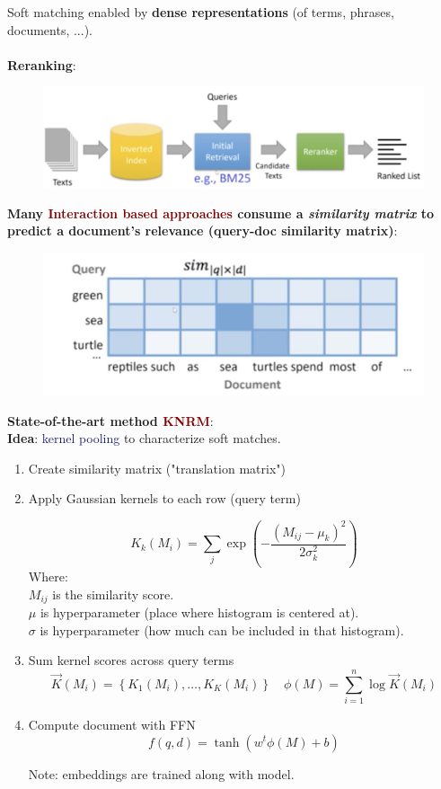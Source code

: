 Soft matching enabled by \textbf{dense representations} (of terms, phrases, documents, ...).\\
\\
\textbf{Reranking}: 
\begin{figure}[ht!]
    \includegraphics[scale=0.75]{figures/reranking.png}
\end{figure}

\vspace{0.35cm}

\textbf{Many \textcolor{Maroon}{Interaction based approaches} consume a \textit{similarity matrix} to predict a document's relevance (query-doc similarity matrix)}: 
\begin{figure}[ht!]
    \includegraphics[scale=0.75]{figures/sim_matrix.png}
\end{figure}

\newpage

\textbf{State-of-the-art method \textcolor{Maroon}{KNRM}}:\\
\textbf{Idea}: \textcolor{MidnightBlue}{kernel pooling} to characterize soft matches.

\begin{enumerate}
    \item Create similarity matrix ("translation matrix")
    \item Apply Gaussian kernels to each row (query term)
    
    $$ K_k (M_i) = \sum_j \exp(- \frac{(M_{ij} - \mu_k)^2}{2\sigma^2_k}) $$
    Where: \\
    $M_{ij}$ is the similarity score. \\
    $\mu$ is hyperparameter (place where histogram is centered at). \\
    $\sigma$ is hyperparameter (how much can be included in that histogram).
    \item Sum kernel scores across query terms
    $$ \vec{K}\left(M_{i}\right)=\left\{K_{1}\left(M_{i}\right), \ldots, K_{K}\left(M_{i}\right)\right\} \quad \phi(M)=\sum_{i=1}^{n} \log \vec{K}\left(M_{i}\right) $$
    \item Compute document with FFN
    $$ f(q,d) = \tanh(w^t \phi(M) + b) $$
    
    Note: embeddings are trained along with model.
\end{enumerate}

